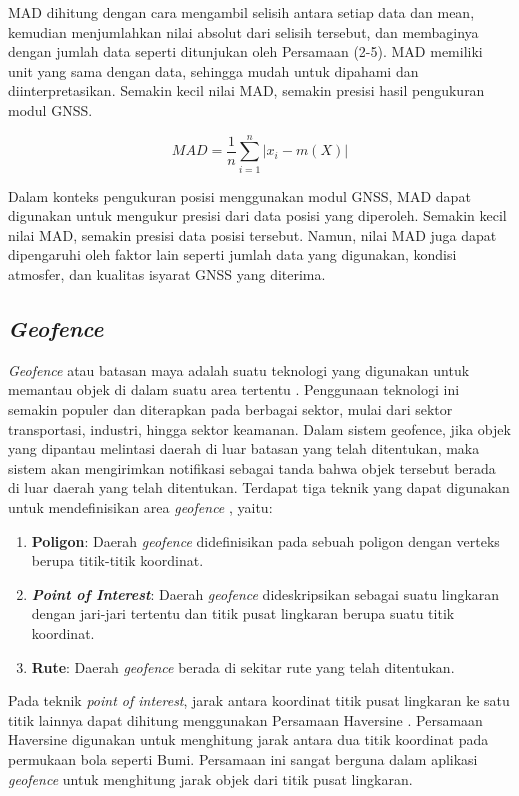 MAD dihitung dengan cara mengambil selisih antara setiap data dan mean, kemudian menjumlahkan nilai absolut dari selisih tersebut, dan membaginya dengan jumlah data seperti ditunjukan oleh Persamaan (2-5). MAD memiliki unit yang sama dengan data, sehingga mudah untuk dipahami dan diinterpretasikan. Semakin kecil nilai MAD, semakin presisi hasil pengukuran modul GNSS.

\begin{equation}
	MAD = \frac{1}{n} \sum_{i=1}^{n} \left| x_i - m(X) \right|
	\label{eq:2-5}
\end{equation}

Dalam konteks pengukuran posisi menggunakan modul GNSS, MAD dapat digunakan untuk mengukur presisi dari data posisi yang diperoleh. Semakin kecil nilai MAD, semakin presisi data posisi tersebut. Namun, nilai MAD juga dapat dipengaruhi oleh faktor lain seperti jumlah data yang digunakan, kondisi atmosfer, dan kualitas isyarat GNSS yang diterima.

\subsection{\textit{Geofence}}
\textit{Geofence} atau batasan maya adalah suatu teknologi yang digunakan untuk memantau objek di dalam suatu area tertentu \cite{Sari2021}. Penggunaan teknologi ini semakin populer dan diterapkan pada berbagai sektor, mulai dari sektor transportasi, industri, hingga sektor keamanan. Dalam sistem geofence, jika objek yang dipantau melintasi daerah di luar batasan yang telah ditentukan, maka sistem akan mengirimkan notifikasi sebagai tanda bahwa objek tersebut berada di luar daerah yang telah ditentukan. Terdapat tiga teknik yang dapat digunakan untuk mendefinisikan area \textit{geofence} \cite{Rui2015}, yaitu:

\begin{enumerate}
	\item \textbf{Poligon}: Daerah \textit{geofence} didefinisikan pada sebuah poligon dengan verteks berupa titik-titik koordinat.
	\item \textbf{\textit{Point of Interest}}: Daerah \textit{geofence} dideskripsikan sebagai suatu lingkaran dengan jari-jari tertentu dan titik pusat lingkaran berupa suatu titik koordinat.
	\item \textbf{Rute}: Daerah \textit{geofence} berada di sekitar rute yang telah ditentukan.
\end{enumerate}

Pada teknik \textit{point of interest}, jarak antara koordinat titik pusat lingkaran ke satu titik lainnya dapat dihitung menggunakan Persamaan Haversine  \cite{Pratama2020}. Persamaan Haversine digunakan untuk menghitung jarak antara dua titik koordinat pada permukaan bola seperti Bumi. Persamaan ini sangat berguna dalam aplikasi \textit{geofence} untuk menghitung jarak objek dari titik pusat lingkaran.


